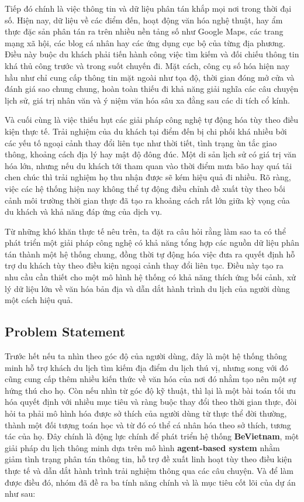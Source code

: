Tiếp đó chính là việc thông tin và dữ liệu phân tán khắp
mọi nơi trong thời đại số. Hiện nay, dữ liệu về các điểm đến, hoạt
động văn hóa nghệ thuật, hay ẩm thực đặc sản phân tán ra trên nhiều
nền tảng số như Google Maps, các trang mạng xã hội, các blog cá nhân
hay các ứng dụng cục bộ của từng địa phương. Điều này buộc du khách
phải tiến hành công việc tìm kiếm và đối chiếu thông tin khá thủ
công trước và trong suốt chuyến đi. Mặt cách, công cụ số hóa hiện nay
hầu như chỉ cung cấp thông tin mặt ngoài như tọa độ, thời gian đóng
mở cửa và đánh giá sao chung chung, hoàn toàn thiếu đi khả năng giải
nghĩa các câu chuyện lịch sử, giá trị nhân văn và ý niệm văn hóa sâu
xa đằng sau các di tích cổ kính.

Và cuối cùng là việc thiếu hụt các giải pháp công nghệ tự
động hóa tùy theo điều kiện thực tế. Trải nghiệm của du khách tại
điểm đến bị chi phối khá nhiều bởi các yếu tố ngoại cảnh thay đổi
liên tục như thời tiết, tình trạng ùn tắc giao thông, khoảng cách địa
lý hay mật độ đông đúc. Một di sản lịch sử có giá trị văn hóa lớn,
nhưng nếu du khách tới tham quan vào thời điểm mưa bão hay quá tải
chen chúc thì trải nghiệm họ thu nhận được sẽ kém hiệu quả đi nhiều. Rõ ràng, việc các hệ thống hiện nay không thể
tự động điều chỉnh đề xuất tùy theo bối cảnh môi trường thời gian
thực đã tạo ra khoảng cách rất lớn giữa kỳ vọng của du khách và
khả năng đáp ứng của dịch vụ.

Từ những khó khăn thực tế nêu trên, ta đặt ra câu hỏi rằng làm sao
ta có thể phát triển một giải pháp công nghệ có khả năng tổng hợp các
nguồn dữ liệu phân tán thành một hệ thống chung, đồng thời tự
động hóa việc đưa ra quyết định hỗ trợ du khách tùy theo điều kiện
ngoại cảnh thay đổi liên tục. Điều này tạo ra nhu cầu cần thiết cho
một mô hình hệ thống có khả năng thích ứng bối cảnh, xử lý dữ liệu
lớn về văn hóa bản địa và dẫn dắt hành trình du lịch của người dùng
một cách hiệu quả.

\subsection{Problem Statement}
\contrib
Trước hết nếu ta nhìn theo góc độ của người dùng, đây là một hệ thống thông minh hỗ trợ khách du lịch
tìm kiếm địa điểm du lịch thú vị, nhưng song với đó cũng cung cấp thêm nhiều kiến thức về văn hóa của nơi đó
nhằm tạo nên một sự hứng thú cho họ. Còn nếu nhìn từ góc độ
kỹ thuật, thì lại là một bài toán tối ưu hóa quyết định với nhiều mục tiêu
và ràng buộc thay đổi theo thời gian thực, đòi hỏi ta phải mô hình hóa được
sở thích của người dùng từ thực thể đời thường, thành một đối tượng toán học và từ đó
có thể cá nhân hóa theo sở thích, tương tác của họ.
Đây chính là động lực chính để phát triển hệ thống
\textbf{BeVietnam}, một giải pháp du lịch thông minh dựa trên mô hình
\textbf{agent-based system} nhằm giảm tình trạng phân tán thông
tin, hỗ trợ đề xuất linh hoạt tùy theo điều kiện thực tế và dẫn dắt hành
trình trải nghiệm thông qua các câu chuyện. Và để làm được điều đó, nhóm đã đề ra
ba tính năng chính và là mục tiêu cốt lõi của dự án như sau:

